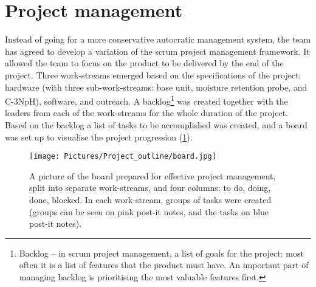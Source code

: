  

\section{Project management}

Instead of going for a more conservative autocratic management system, the team has agreed to develop a variation of the scrum project management framework. It allowed the team to focus on the product to be delivered by the end of the project. Three work-streams emerged based on the specifications of the project: hardware (with three sub-work-streams: base unit, moisture retention probe, and C-3NpH), software, and outreach. A backlog\footnote{Backlog -- in scrum project management, a list of goals for the project: most often it is a list of features that the product must have. An important part of managing backlog is prioritising the most valuable features first.} was created together with the leaders from each of the work-streams for the whole duration of the project. Based on the backlog a list of tasks to be accomplished was created, and a board was set up to visualise the project progression (\cref{fig:board}). 

\begin{figure}[h]
    \centering
    \texttt{[image: Pictures/Project\_outline/board.jpg]}
    \captionsetup{justification=centering}
    \caption{A picture of the board prepared for effective project management, split into separate work-streams, and four columns: to do, doing, done, blocked. In each work-stream, groups of tasks were created (groups can be seen on pink post-it notes, and the tasks on blue post-it notes).}
    \label{fig:board}
\end{figure}


